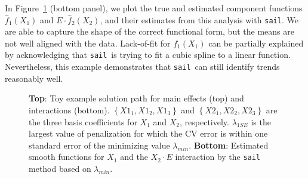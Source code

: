 \documentclass[useAMS,usenatbib,referee]{biom}
\newcommand{\sail}{\texttt{sail}}
\begin{document}
In Figure~\ref{fig:toy-effects} (bottom panel), we plot the true and estimated component functions $\hat{f}_1(X_1)$ and $E \cdot \hat{f}_2(X_2)$, and their estimates from this analysis with \texttt{sail}. 
We are able to capture the shape of the correct functional form, but the means are not well aligned with the data. Lack-of-fit for $f_1(X_1)$ can be partially explained by acknowledging that \sail ~is trying to fit a cubic spline to a linear function. 
Nevertheless, this example demonstrates that \sail ~can still identify trends reasonably well.



%
%
%


	


\begin{figure}[H]
	\centering
	\quad	
	\caption{\textbf{Top}: Toy example solution path for main effects (top) and interactions (bottom). $\left\lbrace X1_1, X1_2, X1_3 \right\rbrace$ and $\left\lbrace X2_1, X2_2, X2_3 \right\rbrace$ are the three basis coefficients for $X_1$ and $X_2$, respectively. $\lambda_{1SE}$ is the largest value of penalization for which the CV error is within one standard error of the minimizing value $\lambda_{min}$. \textbf{Bottom}: Estimated smooth functions for $X_1$ and the $X_2 \cdot E$ interaction by the \texttt{sail} method based on $\lambda_{min}$.}
	\label{fig:toy-effects}
\end{figure}
\end{document}
